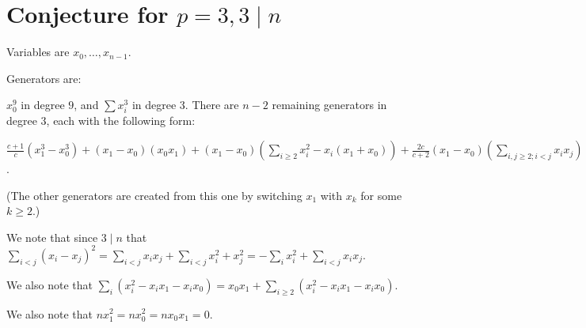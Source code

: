 \documentclass{article}
\numberwithin{equation}{section}
\begin{document}
\section{Conjecture for $p=3, 3 \mid n$}

Variables are $x_0,\dots,x_{n-1}$. 

Generators are:

$x_0^9$ in degree $9$, and $\sum x_i^3$ in degree $3$. There are $n-2$ remaining generators in degree $3$, each with the following form:

$\frac{c+1}{c}(x_1^3-x_0^3) +(x_1-x_0)(x_0x_1)+(x_1-x_0)\left(\sum_{i \ge 2}x_i^2-x_i(x_1+x_0)\right)+\frac{2c}{c+2}(x_1-x_0)\left(\sum_{i,j \ge 2; i < j}x_ix_j\right)$.



(The other generators are created from this one by switching $x_1$ with $x_k$ for some $k \ge 2$.)


We note that since $3 \mid n$ that $\sum_{i < j} (x_i-x_j)^2 = \sum_{i < j} x_ix_j + \sum_{i<j} x_i^2+x_j^2 = -\sum_i x_i^2 + \sum_{i<j} x_ix_j$. 

We also note that $\sum_i (x_i^2-x_ix_1-x_ix_0) = x_0x_1 + \sum_{i \ge 2} (x_i^2-x_ix_1-x_ix_0) $.


We also note that $nx_1^2=nx_0^2=nx_0x_1=0$.
\end{document}
